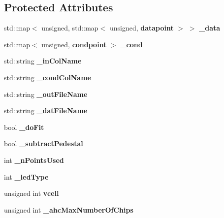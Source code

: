 \subsection*{Protected Attributes}
\begin{DoxyCompactItemize}
\item 
std::map$<$ unsigned, std::map$<$ unsigned, {\bf datapoint} $>$ $>$ {\bfseries \_\-data}\label{classExtractSaturationCurveProcessor_a9489d528a0de4bc27112d94c2c521e63}

\item 
std::map$<$ unsigned, {\bf condpoint} $>$ {\bfseries \_\-cond}\label{classExtractSaturationCurveProcessor_ad25bcf441fa19842d9c5c308833ba76f}

\item 
std::string {\bfseries \_\-inColName}\label{classExtractSaturationCurveProcessor_a50a69322210ddb62c82e3893169fa3ff}

\item 
std::string {\bfseries \_\-condColName}\label{classExtractSaturationCurveProcessor_af34cd07d0d5edc67db05c9c397ac4e83}

\item 
std::string {\bfseries \_\-outFileName}\label{classExtractSaturationCurveProcessor_ab0cc84c9082e3d56fd66a84454b9a1a8}

\item 
std::string {\bfseries \_\-datFileName}\label{classExtractSaturationCurveProcessor_aac6032684847dec6c51f8000895c906c}

\item 
bool {\bfseries \_\-doFit}\label{classExtractSaturationCurveProcessor_a5a9f91b2696b05338c42acd717d396ec}

\item 
bool {\bfseries \_\-subtractPedestal}\label{classExtractSaturationCurveProcessor_a81c12c771d8715003b68cdd155b93ede}

\item 
int {\bfseries \_\-nPointsUsed}\label{classExtractSaturationCurveProcessor_a83bcac5b9e763bc07522c99028dc4da3}

\item 
int {\bfseries \_\-ledType}\label{classExtractSaturationCurveProcessor_a788ccfcf2d60cdd98fa58b8a25960870}

\item 
unsigned int {\bfseries vcell}\label{classExtractSaturationCurveProcessor_a6b92dcd2b25a6e15a9c5e54c964c448a}

\item 
unsigned int {\bf \_\-ahcMaxNumberOfChips}\label{classExtractSaturationCurveProcessor_a6504d810d836fce199cb3a0672c0e7b8}


\end{DoxyCompactItemize}
